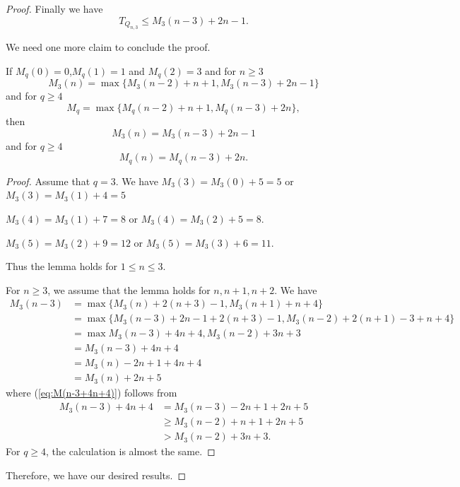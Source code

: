 \documentclass[10pt,a4paper]{amsart}
\renewcommand{\geq}{\geqslant}
\renewcommand{\leq}{\leqslant}
\begin{document}
\begin{proof}

Finally we have 
$$T_{Q_{n,3}} \leq M_3(n-3)+2n-1.$$

We need one more claim to conclude the proof. 
\begin{claim}
If $M_q(0)=0$,$M_q(1)=1$ and $M_q(2)=3$ and  
for $n \geq 3$ 
$$M_3(n)=\max\{M_3(n-2)+n+1,M_3(n-3)+2n-1\}$$
and for $q \geq 4$
$$M_q=\max\{M_q(n-2)+n+1,M_q(n-3)+2n\},$$ then 
$$M_3(n)=M_3(n-3)+2n-1$$
and for $q \geq 4$
$$M_q(n)=M_q(n-3)+2n.$$
\end{claim}
\begin{proof}
Assume that $q=3$. We have $M_3(3)=M_3(0)+5=5$ or $M_3(3)=M_3(1)+4=5$

$M_3(4)=M_3(1)+7=8$ or 
$M_3(4)=M_3(2)+5=8$.

$M_3(5)=M_3(2)+9=12$ or 
$M_3(5)=M_3(3)+6=11$.

Thus the lemma holds for $ 1 \leq n \leq 3$.

For $n \geq 3$, we assume that the lemma holds for $n,n+1,n+2$. We have 
\begin{align}
    M_3(n-3)& =\max\{M_3(n)+2(n+3)-1,M_3(n+1)+n+4\}\\
    &=\max\{M_3(n-3)+2n-1+2(n+3)-1, M_3(n-2)+2(n+1)-3+n+4\}\\
    &= \max{M_3(n-3)+4n+4,M_3(n-2)+3n+3}\\
   \label{eq:M(n-3+4n+4)} &=M_3(n-3)+4n+4\\ 
    &=M_3(n)-2n+1+4n+4\\
    &=M_3(n)+2n+5
\end{align}
where (\ref{eq:M(n-3+4n+4)}) follows from 
\begin{align*}
    M_3(n-3)+4n+4& =M_3(n-3)-2n+1+2n+5\\
    & \geq M_3(n-2)+n+1+2n+5\\
    & > M_3(n-2)+3n+3.
\end{align*}
For $q \geq 4$, the calculation is almost the same. 
\end{proof}
Therefore, we have our desired results.
\end{proof} 
\end{document}
